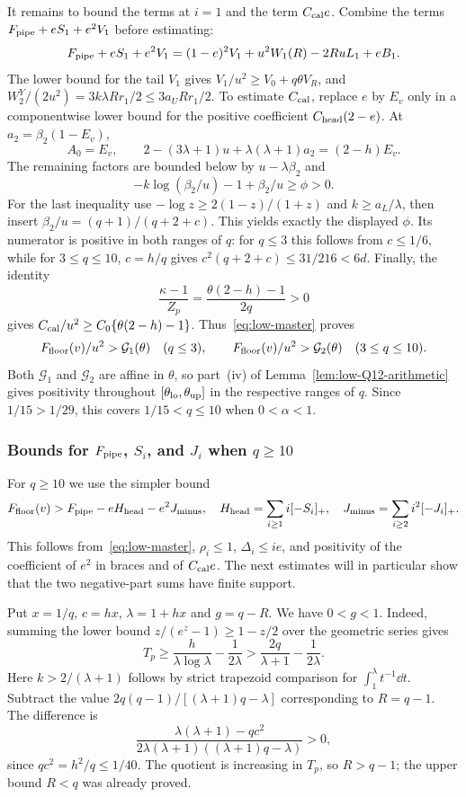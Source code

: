 It remains to bound the terms at $i=1$ and the term $C_{\rm cal}e$.
Combine the terms $F_{\rm pipe}+eS_1+e^2V_1$ before estimating:
\[
 F_{\rm pipe}+eS_1+e^2V_1
 =(1-e)^2V_1+u^2W_1(R)-2RuL_1+eB_1.
\]
The lower bound for the tail $V_1$ gives
$V_1/u^2\ge V_0+q\theta V_R$, and
$W_2^Y/(2u^2)=3k\lambda Rr_1/2\le3a_U Rr_1/2$.
To estimate $C_{\rm cal}$, replace $e$ by $E_v$ only in a
componentwise lower bound for the positive coefficient
$C_{\rm head}(2-e)$.  At $a_2=\beta_2(1-E_v)$,
\[
 A_0=E_v,\qquad
 2-(3\lambda+1)u+\lambda(\lambda+1)a_2=(2-h)E_v.
\]
The remaining factors are bounded below by
$u-\lambda\beta_2$ and
\[
 -k\log(\beta_2/u)-1+\beta_2/u\ge\phi>0.
\]
For the last inequality use
$-\log z\ge2(1-z)/(1+z)$ and $k\ge a_L/\lambda$, then insert
$\beta_2/u=(q+1)/(q+2+c)$.  This yields exactly the displayed
$\phi$. Its numerator is positive in both ranges of $q$:
for $q\le3$ this follows from $c\le1/6$, while for
$3\le q\le10$, $c=h/q$ gives
$c^2(q+2+c)\le31/216<6d$.
Finally, the identity
\[
 \frac{\kappa-1}{Z_p}=\frac{\theta(2-h)-1}{2q}>0
\]
gives $C_{\rm cal}/u^2\ge C_0\{\theta(2-h)-1\}$.
Thus~\eqref{eq:low-master} proves
\[
 F_{\rm floor}(v)/u^2>\mathcal G_1(\theta)\quad(q\le3),
 \qquad
 F_{\rm floor}(v)/u^2>\mathcal G_2(\theta)\quad(3\le q\le10).
\]
Both $\mathcal G_1$ and $\mathcal G_2$ are affine in $\theta$, so
part~(iv) of Lemma~\ref{lem:low-Q12-arithmetic} gives positivity
throughout $[\theta_{\rm lo},\theta_{\rm up}]$ in the respective
ranges of $q$. Since $1/15>1/29$, this covers $1/15<q\le10$
when $0<\alpha<1$.

\subsubsection{\texorpdfstring{Bounds for $F_{\rm pipe}$, $S_i$, and $J_i$ when $q\ge10$}{Bounds for F\_pipe, S(i), and J(i) when q >= 10}}
For $q\ge10$ we use the simpler bound
\begin{equation}\label{eq:low-large-master}
 F_{\rm floor}(v)>F_{\rm pipe}-eH_{\rm head}-e^2J_{\rm minus},
 \quad
 H_{\rm head}=\sum_{i\ge1}i[-S_i]_+,\quad
 J_{\rm minus}=\sum_{i\ge2}i^2[-J_i]_+.
\end{equation}
This follows from~\eqref{eq:low-master}, $\rho_i\le1$,
$\Delta_i\le ie$, and positivity of the coefficient of $e^2$ in braces
and of $C_{\rm cal}e$.
The next estimates will in particular show that the two negative-part
sums have finite support.

Put $x=1/q$, $c=hx$, $\lambda=1+hx$ and $g=q-R$.
We have $0<g<1$. Indeed, summing the lower
bound $z/(e^z-1)\ge1-z/2$ over the geometric series gives
\[
 T_p\ge\frac{h}{\lambda\log\lambda}-\frac1{2\lambda}
       >\frac{2q}{\lambda+1}-\frac1{2\lambda}.
\]
Here $k>2/(\lambda+1)$ follows by strict trapezoid comparison for
$\int_1^\lambda t^{-1}\dd t$.
Subtract the value $2q(q-1)/[(\lambda+1)q-\lambda]$ corresponding
to $R=q-1$.  The difference is
\[
 \frac{\lambda(\lambda+1)-qc^2}
 {2\lambda(\lambda+1)((\lambda+1)q-\lambda)}>0,
\]
since $qc^2=h^2/q\le1/40$.  The quotient is increasing in $T_p$,
so $R>q-1$; the upper bound $R<q$ was already proved.


